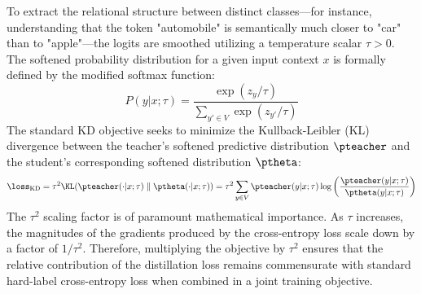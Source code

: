 To extract the relational structure between distinct classes—for instance, understanding that the token "automobile" is semantically much closer to "car" than to "apple"—the logits are smoothed utilizing a temperature scalar $\tau > 0$. The softened probability distribution for a given input context $x$ is formally defined by the modified softmax function:
\begin{equation}
    P(y|x; \tau) = \frac{\exp(z_y / \tau)}{\sum_{y' \in V} \exp(z_{y'} / \tau)}
\end{equation}
The standard KD objective seeks to minimize the Kullback-Leibler (KL) divergence between the teacher's softened predictive distribution $\pteacher$ and the student's corresponding softened distribution $\ptheta$:
\begin{equation}
    \loss_{\mathrm{KD}} = \tau^2 \KL(\pteacher(\cdot|x; \tau) \parallel \ptheta(\cdot|x; \tau)) = \tau^2 \sum_{y \in V} \pteacher(y|x; \tau) \log \left( \frac{\pteacher(y|x; \tau)}{\ptheta(y|x; \tau)} \right)
\end{equation}
The $\tau^2$ scaling factor is of paramount mathematical importance. As $\tau$ increases, the magnitudes of the gradients produced by the cross-entropy loss scale down by a factor of $1/\tau^2$. Therefore, multiplying the objective by $\tau^2$ ensures that the relative contribution of the distillation loss remains commensurate with standard hard-label cross-entropy loss when combined in a joint training objective. 


